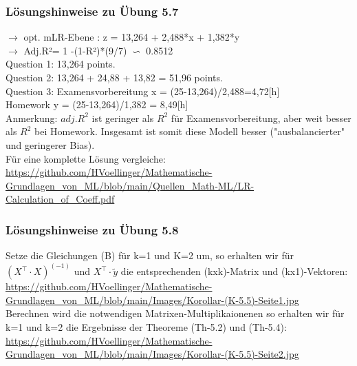 \documentclass[12pt]{article}
\begin{document}
\subsubsection{Lösungshinweise zu Übung 5.7}
%
$\rightarrow$ opt. mLR-Ebene :  z = 13,264 +  2,488*x +  1,382*y \\[0.2cm]				
$\rightarrow$ Adj.R²=  1 -(1-R²)*(9/7) $\backsim $ 0.8512  \\[0.3cm]				
Question 1:  13,264 points.	\\[0.1cm]
Question 2:  13,264 + 24,88 + 13,82 = 51,96 points.\\[0.1cm]
Question 3:  Examensvorbereitung x = (25-13,264)/2,488=4,72[h]\\ Homework y = (25-13,264)/1,382 = 8,49[h]\\[0.2cm]
Anmerkung: $adj.R^2$ ist geringer als $R^2$ für Examensvorbereitung, aber weit besser als $R^2$ bei Homework. Insgesamt ist somit diese Modell besser ("ausbalancierter" und geringerer Bias). \\[0.2cm]
%	
\hspace*{0.0cm}Für eine komplette Lösung vergleiche:\\
\url{https://github.com/HVoellinger/Mathematische-Grundlagen_von_ML/blob/main/Quellen_Math-ML/LR-Calculation_of_Coeff.pdf}

\subsubsection{Lösungshinweise zu Übung 5.8}
%
Setze die Gleichungen (B) für k=1 und K=2 um, so erhalten wir für $(X^\top \cdot X)^{(-1)}$ und $X^\top \cdot \widetilde{y} $ die entsprechenden (kxk)-Matrix und (kx1)-Vektoren:\\
\url{https://github.com/HVoellinger/Mathematische-Grundlagen_von_ML/blob/main/Images/Korollar-(K-5.5)-Seite1.jpg}  \\
Berechnen wird die notwendigen Matrixen-Multiplikaionenen so erhalten wir für k=1 und k=2 die Ergebnisse der Theoreme (Th-5.2) und (Th-5.4):\\
\url{https://github.com/HVoellinger/Mathematische-Grundlagen_von_ML/blob/main/Images/Korollar-(K-5.5)-Seite2.jpg}
%

%
\end{document}
